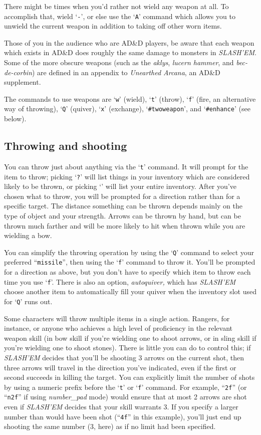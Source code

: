 There might be times when you'd rather not wield any weapon at all.
To accomplish that, wield `{\tt -}', or else use the `{\tt A}' command which
allows you to unwield the current weapon in addition to taking off
other worn items.

Those of you in the audience who are AD\&D players, be aware that each
weapon which exists in AD\&D does roughly the same damage to monsters in
{\it SLASH'EM}.  Some of the more obscure weapons (such as the {\it aklys},
{\it lucern hammer}, and {\it bec-de-corbin\/}) are defined in an
appendix to {\it Unearthed Arcana}, an AD\&D supplement.

The commands to use weapons are `{\tt w}' (wield), `{\tt t}' (throw),
`{\tt f}' (fire, an alternative way of throwing), `{\tt Q}' (quiver),
`{\tt x}' (exchange), `{\tt \#twoweapon}', and `{\tt \#enhance}' (see below).
\subsection*{Throwing and shooting}


You can throw just about anything via the `{\tt t}' command.  It will prompt
for the item to throw; picking `{\tt ?}' will list things in your inventory
which are considered likely to be thrown, or picking `{\tt *}' will list
your entire inventory.  After you've chosen what to throw, you will
be prompted for a direction rather than for a specific target.  The
distance something can be thrown depends mainly on the type of object
and your strength.  Arrows can be thrown by hand, but can be thrown
much farther and will be more likely to hit when thrown while you are
wielding a bow.

You can simplify the throwing operation by using the `{\tt Q}' command to
select your preferred ``{\tt missile}'', then using the `{\tt f}' command to
throw it.  You'll be prompted for a direction as above, but you don't
have to specify which item to throw each time you use `{\tt f}'.  There is
also an option,
{\it autoquiver,\/} 
which has {\it SLASH'EM\/} choose another item to automatically fill your
quiver when the inventory slot used for `{\tt Q}' runs out.

Some characters will throw multiple items in a single action.  Rangers,
for instance, or anyone who achieves a high level of proficiency in
the relevant weapon skill (in bow skill if you're wielding one to
shoot arrows, or in sling skill if you're wielding one to shoot stones).
There is little you can do
to control this; if {\it SLASH'EM\/} decides that you'll be shooting 3 arrows
on the current shot, then three arrows will travel in the direction
you've indicated, even if the first or second succeeds in killing the
target.  You can explicitly limit the number of shots by using a numeric
prefix before the `{\tt t}' or `{\tt f}' command.
For example, ``{\tt 2f}'' (or ``{\tt n2f}'' if using
{\it number_pad\/} 
mode) would ensure that at most 2 arrows are shot
even if {\it SLASH'EM\/} decides that your skill warrants 3.  If you specify
a larger number than would have been shot (``{\tt 4f}'' in this example),
you'll just end up shooting the same number (3, here) as if no limit
had been specified.
